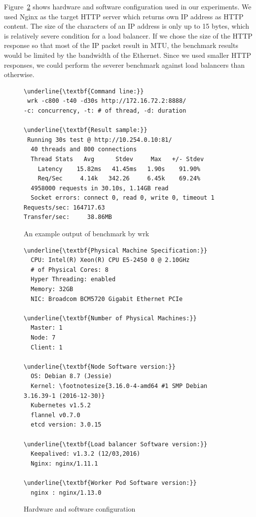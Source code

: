 Figure~\ref{fig:Hardware and software configuration} shows hardware and software configuration used in our experiments.
We used Nginx as the target HTTP server which returns own IP address as HTTP content. 
The size of the characters of an IP address is only up to 15 bytes, 
which is relatively severe condition for a load balancer.
If we chose the size of the HTTP response so that most of the IP packet result in MTU,
the benchmark results would be limited by the bandwidth of the Ethernet.
Since we used smaller HTTP responses, we could perform the severer benchmark against load balancers than otherwise.

\begin{figure}
\begin{minipage}{\columnwidth}
\small
\begin{Verbatim}[commandchars=\\\{\}]
\underline{\textbf{Command line:}}
 wrk -c800 -t40 -d30s http://172.16.72.2:8888/
-c: concurrency, -t: # of thread, -d: duration

\underline{\textbf{Result sample:}}
 Running 30s test @ http://10.254.0.10:81/
  40 threads and 800 connections
  Thread Stats   Avg      Stdev     Max   +/- Stdev
    Latency    15.82ms   41.45ms   1.90s    91.90%
    Req/Sec     4.14k   342.26     6.45k    69.24%
  4958000 requests in 30.10s, 1.14GB read
  Socket errors: connect 0, read 0, write 0, timeout 1
Requests/sec: 164717.63
Transfer/sec:     38.86MB
\end{Verbatim}
\end{minipage}
\caption{An example output of benchmark by wrk}
\label{fig:benchmark example}
\end{figure}

\begin{figure}
\begin{minipage}{0.9\columnwidth}
\small
\begin{Verbatim}[commandchars=\\\{\}]
\underline{\textbf{Physical Machine Specification:}}
  CPU: Intel(R) Xeon(R) CPU E5-2450 0 @ 2.10GHz
  # of Physical Cores: 8
  Hyper Threading: enabled
  Memory: 32GB
  NIC: Broadcom BCM5720 Gigabit Ethernet PCIe

\underline{\textbf{Number of Physical Machines:}}
  Master: 1
  Node: 7
  Client: 1

\underline{\textbf{Node Software version:}}
  OS: Debian 8.7 (Jessie)
  Kernel: \footnotesize{3.16.0-4-amd64 #1 SMP Debian 3.16.39-1 (2016-12-30)}
  Kubernetes v1.5.2
  flannel v0.7.0
  etcd version: 3.0.15

\underline{\textbf{Load balancer Software version:}}
  Keepalived: v1.3.2 (12/03,2016)
  Nginx: nginx/1.11.1

\underline{\textbf{Worker Pod Software version:}}
  nginx : nginx/1.13.0 
\end{Verbatim}
\end{minipage}
\caption{Hardware and software configuration}
\label{fig:Hardware and software configuration}
\end{figure}


